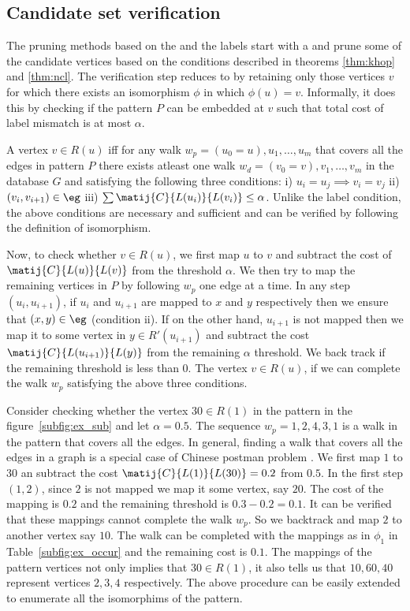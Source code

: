 \subsection{Candidate set verification} \label{sec:verification} The pruning
methods based on the \khop and the \ncl labels start with a \CR and prune some
of the candidate vertices based on the conditions described in theorems
\ref{thm:khop} and \ref{thm:ncl}.  The verification step reduces \CR to \RS by
retaining only those vertices $v$ for which there exists an isomorphism $\phi$ in
which $\phi(u) = v$.  Informally, it does this by checking if the pattern $P$ can be
embedded at $v$ such that total cost of label mismatch is at most $\alpha$.

A vertex $v \in R(u)$ iff for any walk $w_p = (u_0=u), u_1,\ldots,u_m$ that covers all
the edges in pattern $P$ there exists atleast one walk $w_d = (v_0=v), v_1,\ldots,
v_m$ in the database $G$ and satisfying the following three conditions: i) 
$u_i = u_j \implies v_i = v_j$ ii) $(v_i, v_{i+1}) \in \eg$
iii) $\sum\matij{C}{L(u_i)}{L(v_i)} \leq \alpha$.
Unlike the \ncl label condition, the above conditions are necessary and
sufficient and can be verified by following the definition of isomorphism.

Now, to check whether $v \in R(u)$, we first map $u$ to $v$ and subtract the cost of
$\matij{C}{L(u)}{L(v)}$ from the threshold $\alpha$. We then try to map the
remaining vertices in $P$ by following $w_p$ one edge at a time. In any step
$(u_i, u_{i+1})$, if $u_i$ and $u_{i+1}$ are mapped to $x$ and $y$ respectively
then we ensure that $(x, y) \in \eg$
(condition ii). If on the other hand, $u_{i+1}$ is not mapped then we map it
to some vertex in $y \in R'(u_{i+1})$ and subtract the cost
$\matij{C}{L(u_{i+1})}{L(y)}$ from the remaining $\alpha$ threshold. We back
track if the remaining threshold is less than $0$. The vertex $v \in R(u)$, if we
can complete the walk $w_p$ satisfying the above three conditions.

Consider checking whether the vertex $30 \in R(1)$ 
in the pattern in the figure~\ref{subfig:ex_sub} and let $\alpha = 0.5$. The
sequence $w_p = 1, 2, 4, 3, 1$ is a walk in the pattern that covers all the edges.
In general, finding a walk that covers all the edges in a graph is a special
case of Chinese postman problem \cite{chinesepostman}. We first map $1$ to $30$
an subtract the cost $\matij{C}{L(1)}{L(30)} = 0.2$ from $0.5$. In the first
step $(1,2)$, since $2$ is not mapped we map it some vertex, say $20$. The cost
of the mapping is $0.2$ and the remaining threshold is $0.3 -0.2 = 0.1$. It can
be verified that these mappings cannot complete the walk $w_p$. So we backtrack 
and map $2$ to another vertex say $10$. The walk can be completed with the
mappings as in $\phi_1$ in Table~\ref{subfig:ex_occur} and the remaining cost is 
$0.1$. The mappings of the pattern vertices not only implies that $30 \in R(1)$,
it also tells us that $10, 60, 40$ represent vertices $2, 3, 4$ respectively.
The above procedure can be easily extended to enumerate all the isomorphims of the
pattern.
